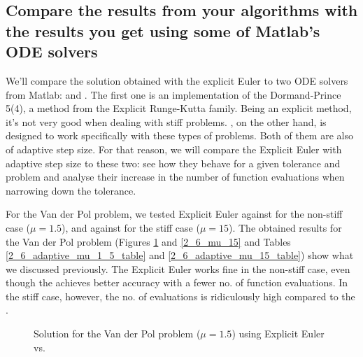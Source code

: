 \pagebreak

\subsection{Compare the results from your algorithms with the results you get using some of Matlab's ODE solvers}
We'll compare the solution obtained with the explicit Euler to two ODE solvers from Matlab:  and . The first one is an implementation of the Dormand-Prince 5(4), a method from the Explicit Runge-Kutta family. Being an explicit method, it's not very good when dealing with stiff problems. , on the other hand, is designed to work specifically with these types of problems. Both of them are also of adaptive step size. For that reason, we will compare the Explicit Euler with adaptive step size to these two: see how they behave for a given tolerance and problem and analyse their increase in the number of function evaluations when narrowing down the tolerance.

For the Van der Pol problem, we tested Explicit Euler against  for the non-stiff case ($\mu = 1.5$), and against  for the stiff case ($\mu = 15$). The obtained results for the Van der Pol problem (Figures \ref{2_6_mu_1_5} and \ref{2_6_mu_15} and Tables \ref{2_6_adaptive_mu_1_5_table} and \ref{2_6_adaptive_mu_15_table}) show what we discussed previously. The Explicit Euler works fine in the non-stiff case, even though the  achieves better accuracy with a fewer no. of function evaluations. In the stiff case, however, the no. of evaluations is ridiculously high compared to the .

\begin{figure}[H]
    \centering
    \caption{Solution for the Van der Pol problem ($\mathit{\mu = 1.5}$) using Explicit Euler vs. }
    \label{2_6_mu_1_5}
\end{figure}

